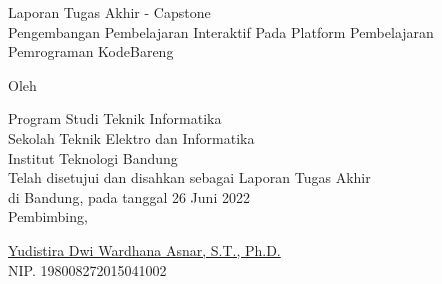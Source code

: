 \clearpage
\pagestyle{empty}

\begin{center}
    \smallskip

    \Large \bfseries \MakeUppercase{\thetitle}
    \vfill

    \Large Laporan Tugas Akhir - Capstone \\
    Pengembangan Pembelajaran Interaktif Pada Platform Pembelajaran Pemrograman KodeBareng
    \vfill

    \large Oleh

    \Large \theauthor

    \large Program Studi Teknik Informatika \\

    \normalsize \normalfont
    Sekolah Teknik Elektro dan Informatika \\
    Institut Teknologi Bandung \\

    \vfill
    \normalsize \normalfont
    Telah disetujui dan disahkan sebagai Laporan Tugas Akhir \\
    di Bandung, pada tanggal 26 Juni 2022 \\

    \vspace{0.3cm}
    Pembimbing,

    \vspace{2cm}
    \underline{Yudistira Dwi Wardhana Asnar, S.T., Ph.D.} \\
    NIP. 198008272015041002

\end{center}
\clearpage
